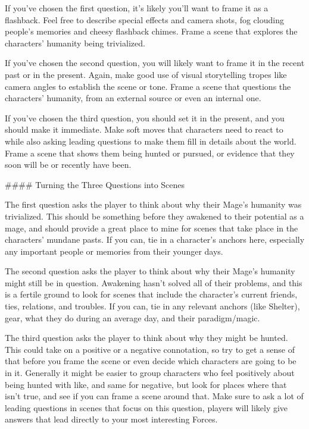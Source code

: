 \documentclass[
  oneside,
  statementpaper,
  9pt]{memoir}
\begin{document}
\begin{MC}
If you’ve chosen the first question, it’s likely you’ll want to frame it as a flashback. Feel free to describe special effects and camera shots, fog clouding people’s memories and cheesy flashback chimes. Frame a scene that explores the characters’ humanity being trivialized.

If you’ve chosen the second question, you will likely want to frame it in the recent past or in the present. Again, make good use of visual storytelling tropes like camera angles to establish the scene or tone. Frame a scene that questions the characters’ humanity, from an external source or even an internal one.

If you’ve chosen the third question, you should set it in the present, and you should make it immediate. Make soft moves that characters need to react to while also asking leading questions to make them fill in details about the world. Frame a scene that shows them being hunted or pursued, or evidence that they soon will be or recently have been.

#### Turning the Three Questions into Scenes

The first question asks the player to think about why their Mage’s humanity was trivialized. This should be something before they awakened to their potential as a mage, and should provide a great place to mine for scenes that take place in the characters’ mundane pasts. If you can, tie in a character’s anchors here, especially any important people or memories from their younger days.

The second question asks the player to think about why their Mage’s humanity might still be in question. Awakening hasn’t solved all of their problems, and this is a fertile ground to look for scenes that include the character’s current friends, ties, relations, and troubles. If you can, tie in any relevant anchors (like Shelter), gear, what they do during an average day, and their paradigm/magic.

The third question asks the player to think about why they might be hunted. This could take on a positive or a negative connotation, so try to get a sense of that before you frame the scene or even decide which characters are going to be in it. Generally it might be easier to group characters who feel positively about being hunted with like, and same for negative, but look for places where that isn’t true, and see if you can frame a scene around that. Make sure to ask a lot of leading questions in scenes that focus on this question, players will likely give answers that lead directly to your most interesting Forces.


\end{MC}
\end{document}
